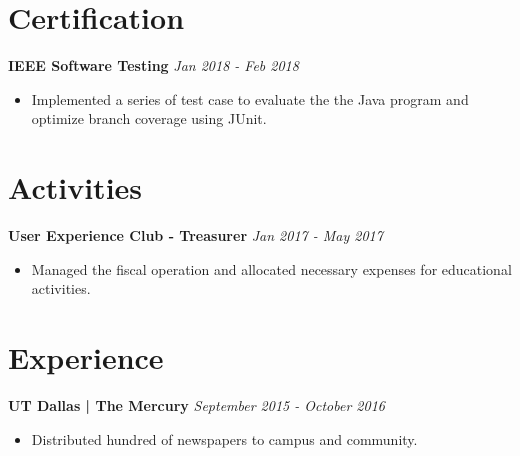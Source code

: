 \documentclass[10pt,a4paper,sans]{article}
\begin{document}
\section{Certification}
{\bf IEEE Software Testing} \hfill {\em Jan 2018 - Feb 2018}
\begin{itemize}
    \item Implemented a series of test case to evaluate the the Java program and optimize branch coverage using JUnit.
\end{itemize}
\section{Activities}
{\bf User Experience Club - Treasurer} \hfill {\em Jan 2017 - May 2017}
\begin{itemize}
    \item Managed the fiscal operation and allocated necessary expenses for educational activities.
\end{itemize}
\section{Experience}
{\bf UT Dallas | The Mercury} \hfill {\em September 2015 - October 2016}
\begin{itemize}
    \item Distributed hundred of newspapers to campus and community.
\end{itemize}
\end{document}

